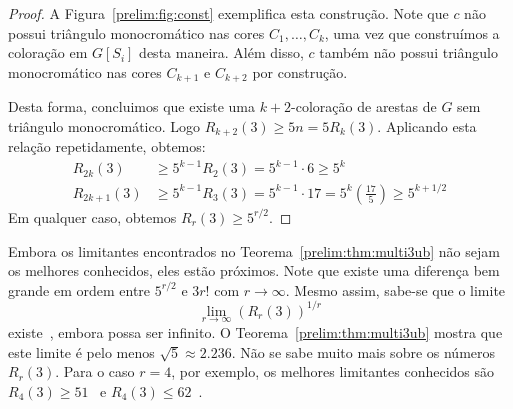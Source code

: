 \begin{proof}
A Figura~\ref{prelim:fig:const} exemplifica esta construção. Note que $c$ não possui triângulo monocromático nas cores $C_1, \dots, C_k$, uma vez que construímos a coloração em $G[S_i]$ desta maneira. Além disso, $c$ também não possui triângulo monocromático nas cores $C_{k+1}$ e $C_{k+2}$ por construção.

Desta forma, concluimos que existe uma $k+2$-coloração de arestas de $G$ sem triângulo monocromático. Logo $R_{k+2}(3) \geq 5n = 5R_k(3)$. Aplicando esta relação repetidamente, obtemos:
\begin{align*}
R_{2k}(3) &\geq 5^{k-1}R_2(3) = 5^{k-1}\cdot6 \geq 5^{k}  \\
R_{2k+1}(3) &\geq 5^{k-1}R_3(3) = 5^{k-1}\cdot17 = 5^k \left(\frac{17}{5}\right) \geq 5^{k + 1/2}
\end{align*}
Em qualquer caso, obtemos $R_{r}(3) \geq 5^{r/2}$.
\end{proof}

Embora os limitantes encontrados no Teorema~\ref{prelim:thm:multi3ub} não sejam os melhores conhecidos, eles estão próximos. Note que existe uma diferença bem grande em ordem entre $5^{r/2}$ e $3r!$ com $r \to \infty$. Mesmo assim, sabe-se que o  limite
\[ \lim_{r \to \infty} \left(R_r(3) \right)^{1/r} \]
existe~\cite{chung1983survey}, embora possa ser infinito. O Teorema~\ref{prelim:thm:multi3ub} mostra que este limite é pelo menos $\sqrt{5} \approx 2.236$.
Não se sabe muito mais sobre os números $R_r(3)$. Para o caso $r=4$, por exemplo, os melhores limitantes conhecidos são $R_4(3) \geq 51$~\cite{chung1973ramsey} e $R_4(3) \leq 62$~\cite{fettes2004upper}.



